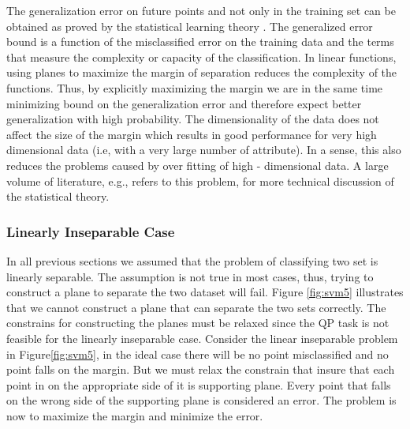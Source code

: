 The generalization error on future points and not only in the training set can be obtained as proved by the statistical learning theory \cite{BennettSVMP2000}.  The generalized error bound is a function of the misclassified error on the training data and the terms that measure the complexity or capacity of the classification. In linear functions, using planes to maximize the margin of separation reduces the complexity of the functions. Thus, by explicitly maximizing the margin we are in the same time minimizing bound on the generalization error and therefore expect better generalization with high probability. The dimensionality of the data does not affect the size of the margin which   results in good performance for very high dimensional data (i.e, with a very large number of attribute). In a sense, this also reduces the problems caused by over fitting of high - dimensional data.  A large volume of literature, e.g., \cite{bookSVMoverfit11,statisticalSVM1} refers to this problem,  for more technical discussion of the   statistical theory. 


\subsubsection{Linearly Inseparable Case}
In all previous sections we assumed that the problem of classifying two set is linearly separable. The assumption is not true in most cases, thus, trying to construct a plane to separate the two dataset will fail. Figure \ref{fig:svm5} illustrates that we cannot construct a plane that can separate the two sets correctly. The constrains for constructing the planes must be relaxed since the QP task is not feasible for the linearly inseparable case.  Consider the linear inseparable problem in Figure\ref{fig:svm5}, in the ideal case there will be no point misclassified and no point falls on the margin. But we must relax the constrain that insure that each point in on the appropriate side of it is supporting plane. Every point that falls on the wrong side of the supporting plane is considered an error. The problem is now to maximize the margin and minimize the error.  
 

